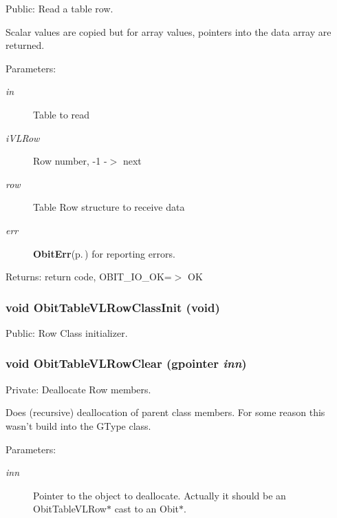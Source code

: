 Public: Read a table row. 

Scalar values are copied but for array values, pointers into the data array are returned. \begin{Desc}
\item[Parameters:]
\begin{description}
\item[{\em in}]Table to read \item[{\em i\-VLRow}]Row number, -1 -$>$ next \item[{\em row}]Table Row structure to receive data \item[{\em err}]{\bf Obit\-Err}{\rm (p.\,\pageref{structObitErr})} for reporting errors. \end{description}
\end{Desc}
\begin{Desc}
\item[Returns:]return code, OBIT\_\-IO\_\-OK=$>$ OK \end{Desc}
\subsubsection{\setlength{\rightskip}{0pt plus 5cm}void Obit\-Table\-VLRow\-Class\-Init (void)}\label{ObitTableVL_8c_a26}


Public: Row Class initializer. 

\subsubsection{\setlength{\rightskip}{0pt plus 5cm}void Obit\-Table\-VLRow\-Clear (gpointer {\em inn})}\label{ObitTableVL_8c_a7}


Private: Deallocate Row members. 

Does (recursive) deallocation of parent class members. For some reason this wasn't build into the GType class. \begin{Desc}
\item[Parameters:]
\begin{description}
\item[{\em inn}]Pointer to the object to deallocate. Actually it should be an Obit\-Table\-VLRow$\ast$ cast to an Obit$\ast$. \end{description}
\end{Desc}
